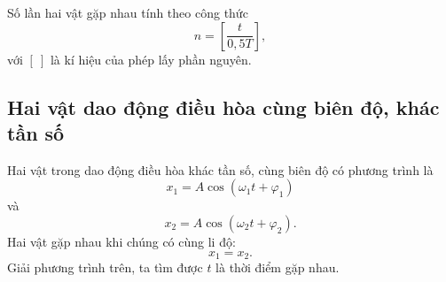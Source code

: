 Số lần hai vật gặp nhau tính theo công thức
\begin{equation*}
	n=\left[\dfrac{t}{0,5T}\right],
\end{equation*}
với $[\ ]$ là kí hiệu của phép lấy phần nguyên.

\subsection{Hai vật dao động điều hòa cùng biên độ, khác tần số}
Hai vật trong dao động điều hòa khác tần số, cùng biên độ có phương trình là
\begin{equation*}
	x_1=A\cos(\omega_1 t+\varphi_1)
\end{equation*}
và 
\begin{equation*}
	x_2=A\cos(\omega_2 t+\varphi_2).
\end{equation*}
Hai vật gặp nhau khi chúng có cùng li độ:
$$x_1=x_2.$$
Giải phương trình trên, ta tìm được $t$ là thời điểm gặp nhau.
